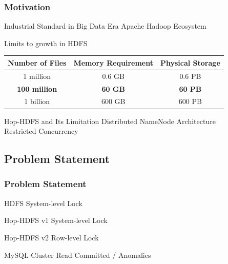 \documentclass{beamer}
\begin{document}
\begin{frame}
\frametitle{Motivation}
\begin{block}{Industrial Standard in Big Data Era}
	Apache Hadoop Ecosystem
\end{block}

\begin{block}{Limits to growth in HDFS}
	\begin{table}[ht]
		\centering
		\begin{tabular}{|c|c|c|}
			\hline
			\textbf{Number of Files} & \textbf{Memory Requirement} & \textbf{Physical Storage} \\ \hline
			1 million       & 0.6 GB             & 0.6 PB           \\ \hline
			{\color{red}\textbf{100 million}}     & {\color{red}\textbf{60 GB}}              & {\color{red}\textbf{60 PB}}            \\ \hline
			1 billion       & 600 GB             & 600 PB           \\ \hline
		\end{tabular}
	\end{table}
\end{block}

\begin{block}{Hop-HDFS and Its Limitation}
	Distributed NameNode Architecture \\ Restricted Concurrency
\end{block}
\end{frame}

\subsection{Problem Statement}
\begin{frame}
\frametitle{Problem Statement}
\begin{block}{HDFS}
	System-level Lock
\end{block}
\begin{block}{Hop-HDFS v1}
	System-level Lock
\end{block}
\begin{block}{Hop-HDFS v2}
	Row-level Lock
\end{block}
\begin{block}{MySQL Cluster}
	Read Committed / Anomalies
\end{block}
\end{frame}

\end{document}

